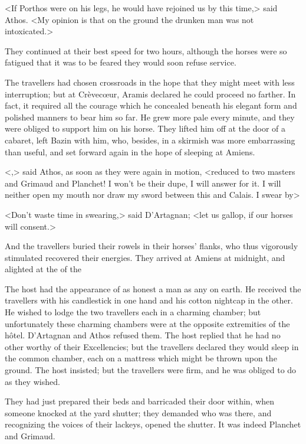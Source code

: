 <If Porthos were on his legs, he would have rejoined us by this time,> said Athos. <My opinion is that on the ground the drunken man was not intoxicated.> 

They continued at their best speed for two hours, although the horses were so fatigued that it was to be feared they would soon refuse service. 

The travellers had chosen crossroads in the hope that they might meet with less interruption; but at Crèvecœur, Aramis declared he could proceed no farther. In fact, it required all the courage which he concealed beneath his elegant form and polished manners to bear him so far. He grew more pale every minute, and they were obliged to support him on his horse. They lifted him off at the door of a cabaret, left Bazin with him, who, besides, in a skirmish was more embarrassing than useful, and set forward again in the hope of sleeping at Amiens. 

<,> said Athos, as soon as they were again in motion, <reduced to two masters and Grimaud and Planchet!  I won't be their dupe, I will answer for it. I will neither open my mouth nor draw my sword between this and Calais. I swear by\longdash> 

<Don't waste time in swearing,> said D'Artagnan; <let us gallop, if our horses will consent.> 

And the travellers buried their rowels in their horses' flanks, who thus vigorously stimulated recovered their energies. They arrived at Amiens at midnight, and alighted at the  of the  

The host had the appearance of as honest a man as any on earth. He received the travellers with his candlestick in one hand and his cotton nightcap in the other. He wished to lodge the two travellers each in a charming chamber; but unfortunately these charming chambers were at the opposite extremities of the hôtel. D'Artagnan and Athos refused them. The host replied that he had no other worthy of their Excellencies; but the travellers declared they would sleep in the common chamber, each on a mattress which might be thrown upon the ground. The host insisted; but the travellers were firm, and he was obliged to do as they wished. 

They had just prepared their beds and barricaded their door within, when someone knocked at the yard shutter; they demanded who was there, and recognizing the voices of their lackeys, opened the shutter. It was indeed Planchet and Grimaud. 

